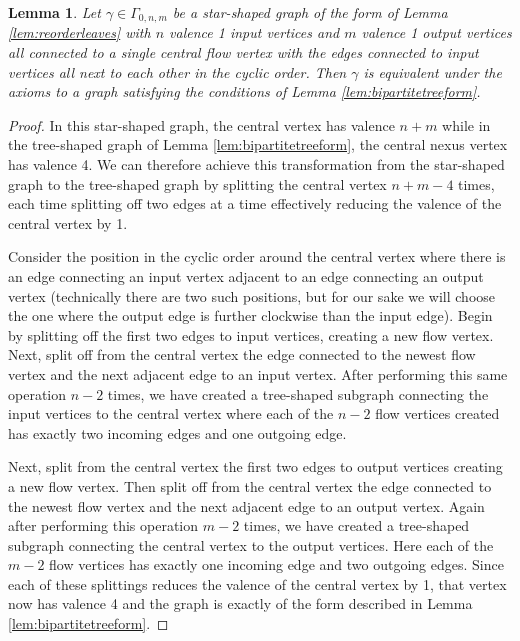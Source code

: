\documentclass{amsart}
\newtheorem{Lem}{Lemma}[section]
\theoremstyle{definition}
\begin{document}
\begin{Lem}\label{lem:staristree}
    Let $\gamma\in\Gamma_{0,n,m}$ be a star-shaped graph of the form of Lemma \ref{lem:reorderleaves} with $n$ valence 1 input vertices and $m$ valence 1 output vertices all connected to a single central flow vertex with the edges connected to input vertices all next to each other in the cyclic order. Then $\gamma$ is equivalent under the axioms to a graph satisfying the conditions of Lemma \ref{lem:bipartitetreeform}.
\end{Lem}
\begin{proof}
    In this star-shaped graph, the central vertex has valence $n+m$ while in the tree-shaped graph of Lemma \ref{lem:bipartitetreeform}, the central nexus vertex has valence 4. We can therefore achieve this transformation from the star-shaped graph to the tree-shaped graph by splitting the central vertex $n+m-4$ times, each time splitting off two edges at a time effectively reducing the valence of the central vertex by 1.

    
   \noindent Consider the position in the cyclic order around the central vertex where there is an edge connecting an input vertex adjacent to an edge connecting an output vertex (technically there are two such positions, but for our sake we will choose the one where the output edge is further clockwise than the input edge). Begin by splitting off the first two edges to input vertices, creating a new flow vertex. Next, split off from the central vertex the edge connected to the newest flow vertex and the next adjacent edge to an input vertex. After performing this same operation $n-2$ times, we have created a tree-shaped subgraph connecting the input vertices to the central vertex where each of the $n-2$ flow vertices created has exactly two incoming edges and one outgoing edge. 

   \noindent Next, split from the central vertex the first two edges to output vertices creating a new flow vertex. Then split off from the central vertex the edge connected to the newest flow vertex and the next adjacent edge to an output vertex. Again after performing this operation $m-2$ times, we have created a tree-shaped subgraph connecting the central vertex to the output vertices. Here each of the $m-2$ flow vertices has exactly one incoming edge and two outgoing edges. Since each of these splittings reduces the valence of the central vertex by 1, that vertex now has valence 4 and the graph is exactly of the form described in Lemma \ref{lem:bipartitetreeform}.
\end{proof}
\end{document}
